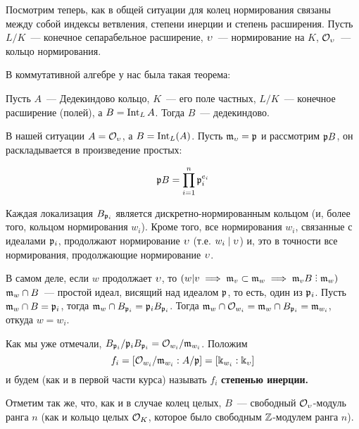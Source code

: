     Посмотрим теперь, как в общей ситуации для колец нормирования связаны между собой индексы ветвления, степени инерции и степень расширения. Пусть $L/K$~--- конечное сепарабельное расширение, $\upsilon$~--- нормирование на $K$, $\mathcal{O}_{\upsilon}$~--- кольцо нормирования. 
  
  В коммутативной алгебре у нас была такая теорема:

	\begin{theorem} 
		Пусть $A$~--- Дедекиндово кольцо, $K$~--- его поле частных, $L/K$~--- конечное расширение (полей), а $B = \operatorname{Int}_{L}{A}$. Тогда $B$~--- дедекиндово. 
	\end{theorem}

	В нашей ситуации $A = \mathcal{O}_{\upsilon}$, а $B = \operatorname{Int}_{L}(A)$. Пусть  $\mathfrak{m}_{\upsilon} = \mathfrak{p}$ и рассмотрим $\mathfrak{p} B$, он раскладывается в произведение простых: 

	\[
		\mathfrak{p} B = \prod_{i = 1}^{n} \mathfrak{p}_{i}^{e_i} 
	\]

	Каждая локализация $B_{\mathfrak{p}_i}$ является дискретно-нормированным кольцом (и, более того, кольцом нормирования $w_i$). Кроме того, все нормирования $w_i$, связанные с идеалами $\mathfrak{p}_i$, продолжают нормирование $\upsilon$ (т.е. $w_i \mid \upsilon$) и, это в точности все нормирования, продолжающие нормирование $\upsilon$.

	В самом деле, если $w$ продолжает $\upsilon$, то $(w \vert v \implies \fm_v \subset \fm_{w} \implies \fm_{v}B \divby \fm_{w})$  $\mathfrak{m}_{w} \cap B$~--- простой идеал, висящий над идеалом $\mathfrak{p}$, то есть, один из $\mathfrak{p}_i$. Пусть $\mathfrak{m}_{w} \cap B = \mathfrak{p}_i$, тогда $\mathfrak{m}_{w} \cap B_{\mathfrak{p}_i} = \mathfrak{p}_i B_{\mathfrak{p}_i}$. Тогда $\mathfrak{m}_{w} \cap \mathcal{O}_{w_i} = \mathfrak{m}_{w} \cap B_{\mathfrak{p}_i} = \mathfrak{m}_{w_i}$, откуда $w = w_i$.

	Как мы уже отмечали, $B_{\mathfrak{p}_i} /\mathfrak{p}_i B_{\mathfrak{p}_i} = \mathcal{O}_{w_i}/\mathfrak{m}_{w_i}$. Положим 
	\[
		f_i = [\mathcal{O}_{w_i}/\mathfrak{m}_{w_i} : A/\mathfrak{p}] = [\Bbbk_{w_i} : \Bbbk_{\upsilon}] 
	\]
	и будем (как и в первой части курса) называть $f_i$ \bf{степенью инерции}.

	Отметим так же, что, как и в случае колец целых, $B$~--- свободный $\mathcal{O}_{\upsilon}$-модуль ранга $n$ (как и кольцо целых $\mathcal{O}_{K}$, которое было свободным $\mathbb{Z}$-модулем ранга $n$).


